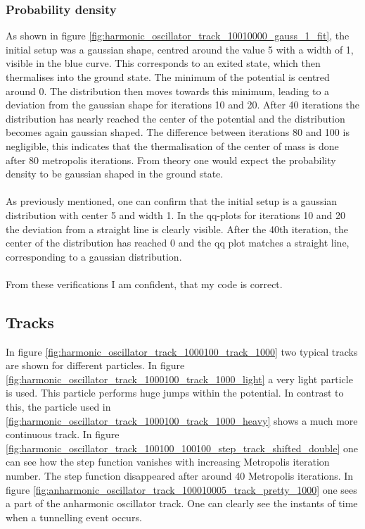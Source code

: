 \documentclass{scrartcl}
\begin{document}
	\subsubsection{Probability density}
		As shown in figure \ref{fig:harmonic_oscillator_track_10010000_gauss_1_fit}, the initial setup was a gaussian shape, centred around the value 5 with a width of 1, visible in the blue curve.
		This corresponds to an exited state, which then thermalises into the ground state.
		The minimum of the potential is centred around 0.
		The distribution then moves towards this minimum, leading to a deviation from the gaussian shape for iterations 10 and 20.
		After 40 iterations the distribution has nearly reached the center of the potential and the distribution becomes again gaussian shaped.
		The difference between iterations 80 and 100 is negligible, this indicates that the thermalisation of the center of mass is done after 80 metropolis iterations.
		From theory one would expect the probability density to be gaussian shaped in the ground state.
		\\\\
		As previously mentioned, one can confirm that the initial setup is a gaussian distribution with center 5 and width 1.
		In the qq-plots for iterations 10 and 20 the deviation from a straight line is clearly visible.
		After the 40th iteration, the center of the distribution has reached 0 and the qq plot matches a straight line, corresponding to a gaussian distribution.
		\\\\
		From these verifications I am confident, that my code is correct.

	\subsection{Tracks}
		In figure \ref{fig:harmonic_oscillator_track_1000100_track_1000} two typical tracks are shown for different particles.
		In figure \ref{fig:harmonic_oscillator_track_1000100_track_1000_light} a very light particle is used.
		This particle performs huge jumps within the potential.
		In contrast to this, the particle used in \ref{fig:harmonic_oscillator_track_1000100_track_1000_heavy} shows a much more continuous track.
		In figure \ref{fig:harmonic_oscillator_track_100100_100100_step_track_shifted_double} one can see how the step function vanishes with increasing Metropolis iteration number.
		The step function disappeared after around 40 Metropolis iterations.
		In figure \ref{fig:anharmonic_oscillator_track_100010005_track_pretty_1000} one sees a part of the anharmonic oscillator track.
		One can clearly see the instants of time when a tunnelling event occurs.
\end{document}
